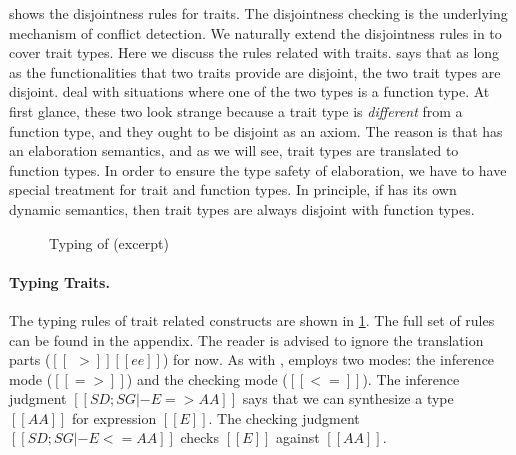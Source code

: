  shows the disjointness rules for traits. The disjointness checking is the underlying
mechanism of conflict detection. We naturally extend the disjointness rules in
\fnamee to cover trait types. Here we discuss the rules
related with traits.  says that as long as the functionalities
that two traits provide are disjoint, the two trait types are disjoint.
 deal with situations where one of the two types
is a function type. At first glance, these two look strange because a trait type is
\textit{different} from a function type, and they ought to be disjoint as an axiom. The reason
is that \sedel has an elaboration semantics, and as we will see, trait types are translated to function
types. In order to ensure the type safety of elaboration, we have to have special treatment for trait
and function types. In principle, if \sedel has its own dynamic semantics, then trait types are always disjoint
with function types.

\begin{figure}[t]
  \centering
  \begin{small}
  \end{small}
  \caption{Typing of \sedel (excerpt)}
  \label{fig:type}
\end{figure}

\paragraph{Typing Traits.}

The typing rules of trait related constructs are shown in \cref{fig:type}. The full set of rules can be found in the appendix.
The reader is advised to ignore the translation parts ($[[~~>]] [[ee]]$) for now.
As with \fnamee, \sedel employs two modes: the inference mode
($[[=>]]$) and the checking mode ($[[<=]]$). The inference judgment $[[ SD ; SG |- E => AA]]$
says that we can synthesize a type $[[AA]]$ for expression $[[E]]$.
The checking judgment $[[SD; SG |- E <= AA]]$ checks $[[E]]$ against $[[AA]]$.


